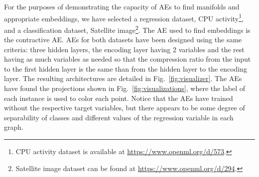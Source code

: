 For the purposes of demonstrating the capacity of AEs to find manifolds and appropriate embeddings, we have selected a regression dataset, CPU activity\footnote{CPU activity dataset is available at \url{https://www.openml.org/d/573}.}, and a classification dataset, Satellite image\footnote{Satellite image dataset can be found at \url{https://www.openml.org/d/294}.}. The AE used to find embeddings is the contractive AE. AEs for both datasets have been designed using the same criteria: three hidden layers, the encoding layer having 2 variables and the rest having as much variables as needed so that the compression ratio from the input to the first hidden layer is the same than from the hidden layer to the encoding layer. The resulting architectures are detailed in Fig.~\ref{fig:visualizer}. The AEs have found the projections shown in Fig.~\ref{fig:visualizations}, where the label of each instance is used to color each point. Notice that the AEs have trained without the respective target variables, but there appears to be some degree of separability of classes and different values of the regression variable in each graph.

